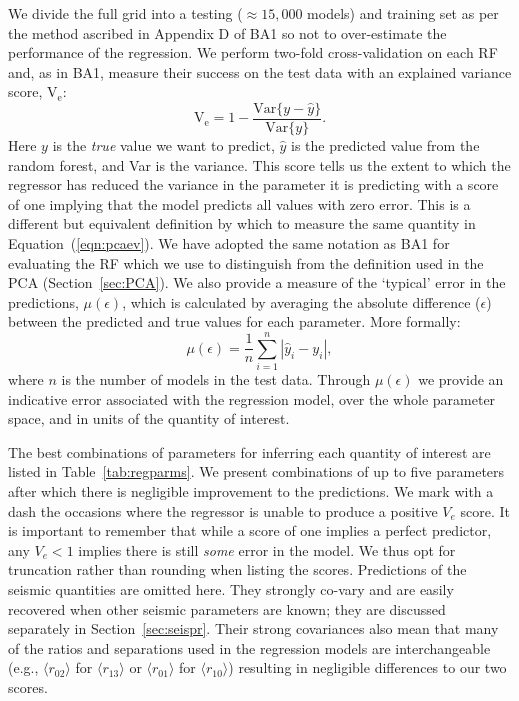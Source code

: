 We divide the full grid into a testing (${\approx 15,000}$ models) and training set as per the method ascribed in Appendix D of BA1 so not to over-estimate the performance of the regression. 
We perform two-fold cross-validation on each RF and, as in BA1, measure their success on the test data with an explained variance score, V$_{\text{e}}$:
\begin{equation}
\label{eqn:ve}
  \text{V}_{\text{e}} = 1 - \frac{\text{Var}\{ y - \hat y \}}{\text{Var}\{ y \}}.
\end{equation}
Here $y$ is the \emph{true} value we want to predict, $\hat{y}$ is the predicted value from the random forest, and Var is the variance. This score tells us the extent to which the regressor has reduced the variance in the parameter it is predicting with a score of one implying that the model predicts all values with zero error. This is a different but equivalent definition by which to measure the same quantity in Equation~(\ref{eqn:pcaev}). We have adopted the same notation as BA1 for evaluating the RF which we use to distinguish from the definition used in the PCA (Section~\ref{sec:PCA}). We also provide a measure of the `typical' error in the predictions, ${\mu (\epsilon)}$,  which is calculated by averaging the absolute difference ($\epsilon$) between the predicted and true values for each parameter. More formally: 
\begin{equation}
\label{eqn:mu}
    \mu (\epsilon) = \frac{1}{n} \sum^n_{i=1} | \hat y_i - y_i |,
\end{equation}
where $n$ is the number of models in the test data. Through ${\mu (\epsilon)}$  we provide an indicative error associated with the regression model, over the whole parameter space, and  in units of the quantity of interest.  

The best combinations of parameters for inferring each quantity of interest are listed in Table~\ref{tab:regparms}. 
We present combinations of up to five parameters after which there is negligible improvement to the predictions. 
We mark with a dash the occasions where the regressor is unable to produce a positive $V_e$ score.  
It is important to remember that while a score of one implies a perfect predictor, any ${V_e < 1}$ implies there is still \emph{some} error in the model.  We thus opt for truncation rather than rounding when listing the scores. 
Predictions of the seismic quantities are omitted here.  They strongly co-vary and are easily recovered when other seismic parameters are known; they are discussed separately in  Section~\ref{sec:seispr}. 
Their strong covariances also mean that many of the ratios and separations used in the regression models are interchangeable (e.g., ${\langle r_{02}\rangle}$ for 
${\langle r_{13}\rangle}$ or ${\langle r_{01}\rangle}$ for ${\langle r_{10}\rangle}$) resulting in negligible differences to our two scores. 

